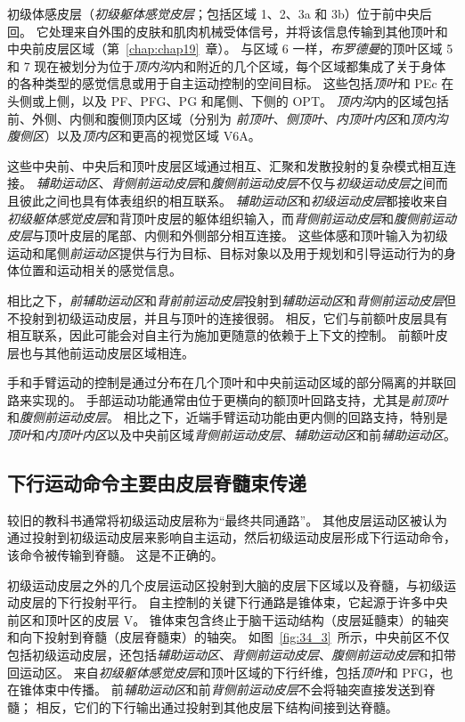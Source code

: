 初级体感皮层（\textit{初级躯体感觉皮层}；包括区域 1、2、3a 和 3b）位于前中央后回。
它处理来自外围的皮肤和肌肉机械受体信号，并将该信息传输到其他顶叶和中央前皮层区域（第~\ref{chap:chap19}~章）。
与区域 6 一样，\textit{布罗德曼}的顶叶区域 5 和 7 现在被划分为位于\textit{顶内沟}内和附近的几个区域，每个区域都集成了关于身体的各种类型的感觉信息或用于自主运动控制的空间目标。
这些包括\textit{顶叶}和 PEc 在头侧或上侧，以及 PF、PFG、PG 和尾侧、下侧的 OPT。
\textit{顶内沟}内的区域包括前、外侧、内侧和腹侧顶内区域（分别为 \textit{前顶叶}、\textit{侧顶叶}、\textit{内顶叶内区}和\textit{顶内沟腹侧区}）以及\textit{顶内区}和更高的视觉区域 V6A。


这些中央前、中央后和顶叶皮层区域通过相互、汇聚和发散投射的复杂模式相互连接。
\textit{辅助运动区}、\textit{背侧前运动皮层}和\textit{腹侧前运动皮层}不仅与\textit{初级运动皮层}之间而且彼此之间也具有体表组织的相互联系。
\textit{辅助运动区}和\textit{初级运动皮层}都接收来自\textit{初级躯体感觉皮层}和背顶叶皮层的躯体组织输入，而\textit{背侧前运动皮层}和\textit{腹侧前运动皮层}与顶叶皮层的尾部、内侧和外侧部分相互连接。
这些体感和顶叶输入为初级运动和尾侧\textit{前运动区}提供与行为目标、目标对象以及用于规划和引导运动行为的身体位置和运动相关的感觉信息。


相比之下，\textit{前辅助运动区}和\textit{背前前运动皮层}投射到\textit{辅助运动区}和\textit{背侧前运动皮层}但不投射到初级运动皮层，并且与顶叶的连接很弱。
相反，它们与前额叶皮层具有相互联系，因此可能会对自主行为施加更随意的依赖于上下文的控制。
前额叶皮层也与其他前运动皮层区域相连。


手和手臂运动的控制是通过分布在几个顶叶和中央前运动区域的部分隔离的并联回路来实现的。
手部运动功能通常由位于更横向的额顶叶回路支持，尤其是\textit{前顶叶}和\textit{腹侧前运动皮层}。
相比之下，近端手臂运动功能由更内侧的回路支持，特别是\textit{顶叶}和\textit{内顶叶内区}以及中央前区域\textit{背侧前运动皮层}、\textit{辅助运动区}和前\textit{辅助运动区}。



\subsection{下行运动命令主要由皮层脊髓束传递}

较旧的教科书通常将初级运动皮层称为“最终共同通路”。
其他皮层运动区被认为通过投射到初级运动皮层来影响自主运动，然后初级运动皮层形成下行运动命令，该命令被传输到脊髓。
这是不正确的。


初级运动皮层之外的几个皮层运动区投射到大脑的皮层下区域以及脊髓，与初级运动皮层的下行投射平行。
自主控制的关键下行通路是锥体束，它起源于许多中央前区和顶叶区的皮层 V。
锥体束包含终止于脑干运动结构（皮层延髓束）的轴突和向下投射到脊髓（皮层脊髓束）的轴突。
如图~\ref{fig:34_3}~所示，中央前区不仅包括初级运动皮层，还包括\textit{辅助运动区}、\textit{背侧前运动皮层}、\textit{腹侧前运动皮层}和扣带回运动区。
来自\textit{初级躯体感觉皮层}和顶叶区域的下行纤维，包括\textit{顶叶}和 PFG，也在锥体束中传播。
前\textit{辅助运动区}和前\textit{背侧前运动皮层}不会将轴突直接发送到脊髓；
相反，它们的下行输出通过投射到其他皮层下结构间接到达脊髓。


